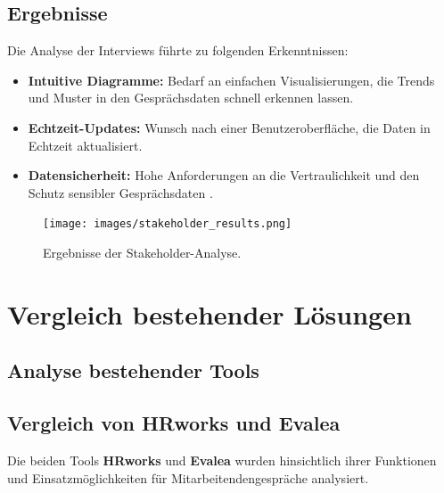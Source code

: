 \subsection{Ergebnisse}
Die Analyse der Interviews führte zu folgenden Erkenntnissen:
\begin{itemize}
    \item \textbf{Intuitive Diagramme:} Bedarf an einfachen Visualisierungen, die Trends und Muster in den Gesprächsdaten schnell erkennen lassen.
    \item \textbf{Echtzeit-Updates:} Wunsch nach einer Benutzeroberfläche, die Daten in Echtzeit aktualisiert.
    \item \textbf{Datensicherheit:} Hohe Anforderungen an die Vertraulichkeit und den Schutz sensibler Gesprächsdaten \cite{bryson2011employee}.
\end{itemize}

\begin{figure}[h!]
    \centering
    \texttt{[image: images/stakeholder\_results.png]}
    \caption{Ergebnisse der Stakeholder-Analyse.}
    \label{fig:stakeholder_results}
\end{figure}

\section{Vergleich bestehender Lösungen}
\subsection{Analyse bestehender Tools}
\subsection{Vergleich von HRworks und Evalea}
Die beiden Tools \textbf{HRworks} und \textbf{Evalea} wurden hinsichtlich ihrer Funktionen und Einsatzmöglichkeiten für Mitarbeitendengespräche analysiert.

